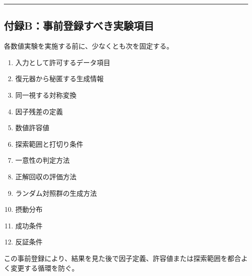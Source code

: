 \documentclass[
  a4paper,
]{ltjsarticle}
\providecommand{\tightlist}{%
  \setlength{\itemsep}{0pt}\setlength{\parskip}{0pt}}
\begin{document}
\begin{center}\rule{0.5\linewidth}{0.5pt}\end{center}

\subsection{付録B：事前登録すべき実験項目}\label{ux4ed8ux9332bux4e8bux524dux767bux9332ux3059ux3079ux304dux5b9fux9a13ux9805ux76ee}

各数値実験を実施する前に、少なくとも次を固定する。

\begin{enumerate}
\def\labelenumi{\arabic{enumi}.}
\tightlist
\item
  入力として許可するデータ項目
\item
  復元器から秘匿する生成情報
\item
  同一視する対称変換
\item
  因子残差の定義
\item
  数値許容値
\item
  探索範囲と打切り条件
\item
  一意性の判定方法
\item
  正解回収の評価方法
\item
  ランダム対照群の生成方法
\item
  摂動分布
\item
  成功条件
\item
  反証条件
\end{enumerate}

この事前登録により、結果を見た後で因子定義、許容値または探索範囲を都合よく変更する循環を防ぐ。
\end{document}
